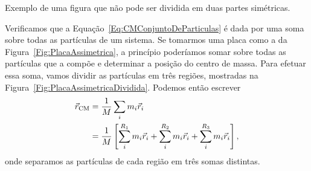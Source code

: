 \begin{marginfigure}
\centering
{}
\caption{Exemplo de uma figura que não pode ser dividida em duas partes simétricas. \label{Fig:PlacaAssimetrica}}
\end{marginfigure}

Verificamos que a Equação~\ref{Eq:CMConjuntoDeParticulas} é dada por uma soma sobre todas as partículas de um sistema. Se tomarmos uma placa como a da Figura~\ref{Fig:PlacaAssimetrica}, a princípio poderíamos somar sobre todas as partículas que a compõe e determinar a posição do centro de massa. Para efetuar essa soma, vamos dividir as partículas em três regiões, mostradas na Figura~\ref{Fig:PlacaAssimetricaDividida}. Podemos então escrever
\begin{align}
    \vec{r}_{\rm{CM}} &= \frac{1}{M} \sum_{i} m_i \vec{r}_i \\
    &= \frac{1}{M} \left[ \sum_{i}^{R_1} m_i \vec{r}_i + \sum_{i}^{R_2} m_i \vec{r}_i +\sum_{i}^{R_3} m_i \vec{r}_i\right], \label{Eq:Discretizando}
\end{align}
%
onde separamos as partículas de cada região em três somas distintas.

